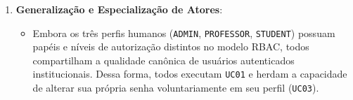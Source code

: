 \begin{enumerate}
    \item \textbf{Generalização e Especialização de Atores}:
    \begin{itemize}
        \item Embora os três perfis humanos (\texttt{ADMIN}, \texttt{PROFESSOR}, \texttt{STUDENT}) possuam papéis e níveis de autorização distintos no modelo RBAC, todos compartilham a qualidade canônica de usuários autenticados institucionais. Dessa forma, todos executam \texttt{UC01} e herdam a capacidade de alterar sua própria senha voluntariamente em seu perfil (\texttt{UC03}).
    \end{itemize}
\end{enumerate}
